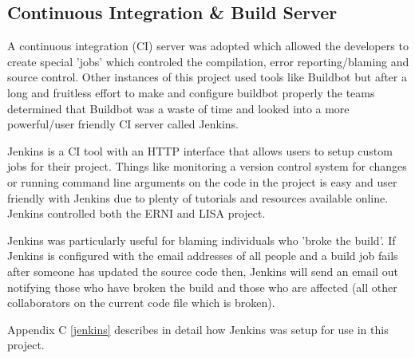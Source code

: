 \subsection{Continuous Integration \& Build Server}

A continuous integration (CI) server was adopted which allowed the developers to create special 'jobs' which  controled the compilation, error reporting/blaming and source control. Other instances of this project used tools like Buildbot but after a long and fruitless effort to make and configure buildbot properly the teams determined that Buildbot was a waste of time and looked into a more powerful/user friendly CI server called Jenkins. 

Jenkins is a CI tool with an HTTP interface that allows users to setup custom jobs for their project. Things like monitoring a version control system for changes or running command line arguments on the code in the project is easy and user friendly with Jenkins due to plenty of tutorials and resources available online. Jenkins controlled both the ERNI and LISA project. 

Jenkins was particularly useful for blaming individuals who 'broke the build'. If Jenkins is configured with the email addresses of all people and a build job fails after someone has updated the source code then, Jenkins will send an email out notifying those who have broken the build and those who are affected (all other collaborators on the current code file which is broken).

Appendix C \ref{jenkins} describes in detail how Jenkins was setup for use in this project.
